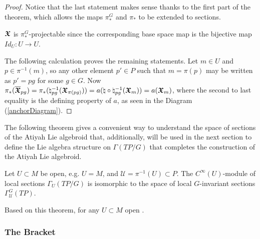 \begin{proof}
Notice that the last statement makes sense thanks to the first part of the theorem, which allows the maps $\pi_*^G$ and $\pi_*$ to be extended to sections.%

$\bm{\mathfrak{X}}$ is $\pi_*^G$-projectable since the corresponding base space map is the bijective map $Id_U: U \to U$.

The following calculation proves the remaining statements. Let $m \in U$ and $p \in \pi^{-1}(m)$, so any other element $p' \in P$ such that $m = \pi(p)$ may be written as $p' = pg$ for some $g \in G$. Now %
$\pi_*(\overline{\bm{\bm{\mathfrak{X}}}}_{pg}) = \pi_*(\natural^{-1}_{pg}(\bm{\mathfrak{X}}_{\pi(pg)})) = a(\natural \circ \natural^{-1}_{pg}(\bm{\mathfrak{X}}_{m})) = a(\bm{\mathfrak{X}}_{m})$, where the second to last equality is the defining property of $a$, as seen in the Diagram (\ref{anchorDiagram}). 
\end{proof}

The following theorem gives a convenient way to understand the space of sections of the Atiyah Lie algebroid that, additionally, will be used in the next section to define the Lie algebra structure on $\Gamma(TP/G)$ that completes the construction of the Atiyah Lie algebroid.

\begin{theorem}\label{theoSectTPG}
Let $U \subset M$ be open, e.g. $U = M$, and $\mathcal U = \pi^{-1}(U) \subset P$. The $C^\infty(U)$-module of local sections $\Gamma_U(TP/G)$ is isomorphic to the space of local $G$-invariant sections $\Gamma^G_{\mathcal U}(TP)$.
\end{theorem}

Based on this theorem, for any $U \subset M$ open .

\subsubsection{The Bracket}

